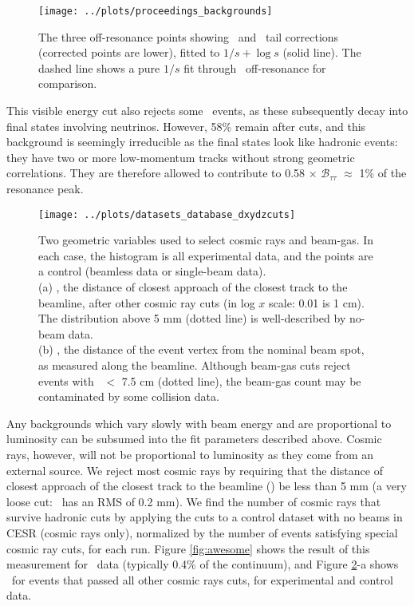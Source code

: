 \documentclass[aps,prd,preprint,superscriptaddress,tightenlines,nofootinbib,floatfix]{revtex4}
\begin{document}
\begin{figure}[p]
  \begin{center}
    \texttt{[image: ../plots/proceedings\_backgrounds]}
  \end{center}
  \caption{\label{fig:backfit} The three off-resonance points showing
    \uone\ and \utwo\ tail corrections (corrected points are lower),
    fitted to $1/s + \log s$ (solid line).  The dashed line shows a
    pure $1/s$ fit through \uone\ off-resonance for comparison.}
\end{figure}

This visible energy cut also rejects some \tautau\ events, as these
subsequently decay into final states involving neutrinos.  However,
58\% remain after cuts, and this background is seemingly irreducible
as the final states look like hadronic events: they have two or more
low-momentum tracks without strong geometric correlations.  They are
therefore allowed to contribute to 0.58 $\times$
$\mathcal{B}_{\tau\tau}$ $\approx$ 1\% of the resonance peak.

\begin{figure}[p]
  \texttt{[image: ../plots/datasets\_database\_dxydzcuts]}
  \caption{\label{fig:cosbg} Two geometric variables used to select
    cosmic rays and beam-gas.  In each case, the histogram is all
    experimental data, and the points are a control (beamless data or
    single-beam data). \vspace{0.2 cm} \\
    (a) \dxy, the distance of closest approach of the
    closest track to the beamline, after other cosmic ray cuts (in log
    $x$ scale: 0.01 is 1 cm).  The distribution above 5 mm (dotted
    line) is well-described by no-beam data. \vspace{0.2 cm} \\
    (b) \dz, the distance of the event vertex from the
    nominal beam spot, as measured along the beamline.  Although
    beam-gas cuts reject events with \dz\ $<$ 7.5 cm (dotted line), the
    beam-gas count may be contaminated by some collision data.}
\end{figure}

Any backgrounds which vary slowly with beam energy and are
proportional to luminosity can be subsumed into the fit parameters
described above.  Cosmic rays, however, will not be proportional to
luminosity as they come from an external source.  We reject most
cosmic rays by requiring that the distance of closest approach of the
closest track to the beamline (\dxy) be less than 5 mm (a very loose
cut: \dxy\ has an RMS of 0.2 mm).  We find the number of cosmic rays
that survive hadronic cuts by applying the cuts to a control dataset
with no beams in CESR (cosmic rays only), normalized by the number of
events satisfying special cosmic ray cuts, for each run.
Figure \ref{fig:awesome} shows the result of this measurement for
\uthree\ data (typically 0.4\% of the continuum), and Figure
\ref{fig:cosbg}-a shows \dxy\ for events that passed all other cosmic
rays cuts, for experimental and control data.
\end{document}
